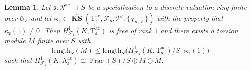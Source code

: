 \documentclass[12pt,reqno]{amsart}
\newtheorem{lemma}[theorem]{Lemma}
\theoremstyle{definition}
\theoremstyle{remark}
\newcommand{\OF}{\mathcal{O}_F}
\newcommand{\T}{\boldsymbol{\mathrm{T}}}
\newcommand{\calR}{\mathcal{R}}
\newcommand{\A}{\boldsymbol{\mathrm{A}}}
\DeclareMathOperator{\Frac}{Frac}
\DeclareMathOperator{\ks}{KS}
\newcommand{\KS}{\boldsymbol{\ks}}
\newcommand{\ac}{\mathrm{ac}}
\newcommand{\length}{\mathrm{length}}
\newcommand{\gk}{\kappa}
\newcommand{\sfrak}{\mathfrak{s}}
\begin{document}
\begin{lemma}\label{lem:Howard-result}
    Let $\sfrak\colon \calR^{\ac}\to S$ be a specialization to a discrete valuation ring finite over $\OF$ and let $\boldsymbol{\gk}_\sfrak\in \overline{\KS}(\T^\ac_\sfrak,\mathcal{F}_\sfrak,\mathcal{P}',\{\chi_{n,\ell}\})$ with the property that $\boldsymbol{\gk}_\sfrak(1)\ne 0$. Then $H^1_{\mathcal{F}_\sfrak}(K,\T_{\sfrak}^\ac)$ is free of rank $1$ and there exists a torsion module $M$ finite over $S$ with
    \begin{equation*}
        \length_S(M)\le \length_S\big(H^1_{\mathcal{F}_\sfrak}(K,\T_{\sfrak}^\ac)/S\cdot\boldsymbol{\gk}_\sfrak(1)\big)
    \end{equation*}
    such that $H^1_{\mathcal{F}_\sfrak}(K,\A_{\sfrak}^\ac)\cong \Frac(S)/S\oplus M\oplus M$.
\end{lemma}
\end{document}

